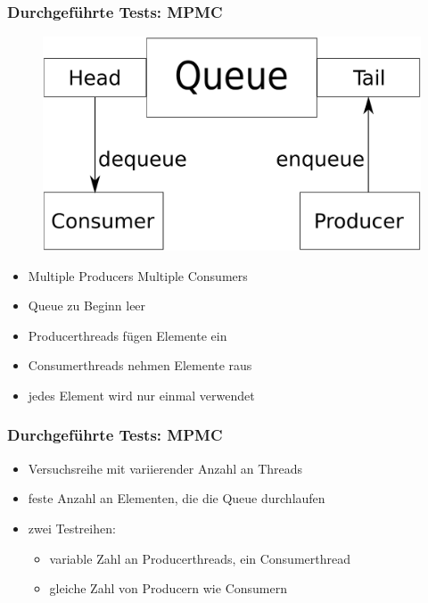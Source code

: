 \documentclass[svgnames]{beamer}
\begin{document}
\begin{frame}
\frametitle{Durchgef\"uhrte Tests: MPMC}
\begin {figure}
      \begin{center}
	\includegraphics[scale=0.25]{mpmc.pdf}
     \end{center}
\end {figure}

\begin{itemize}
 \item Multiple Producers Multiple Consumers
 \item Queue zu Beginn leer
 \item Producerthreads f\"ugen Elemente ein
 \item Consumerthreads nehmen Elemente raus
 \item jedes Element wird nur einmal verwendet


\end{itemize}
\end{frame}

\begin{frame}
\frametitle{Durchgef\"uhrte Tests: MPMC}
\begin{itemize}
 \item Versuchsreihe mit variierender Anzahl an Threads
 \item feste Anzahl an Elementen, die die Queue durchlaufen
 \item zwei Testreihen:
\begin{itemize}
 \item variable Zahl an Producerthreads, ein Consumerthread
 \item gleiche Zahl von Producern wie Consumern
\end{itemize}


\end{itemize}
\end{frame}
\end{document}
